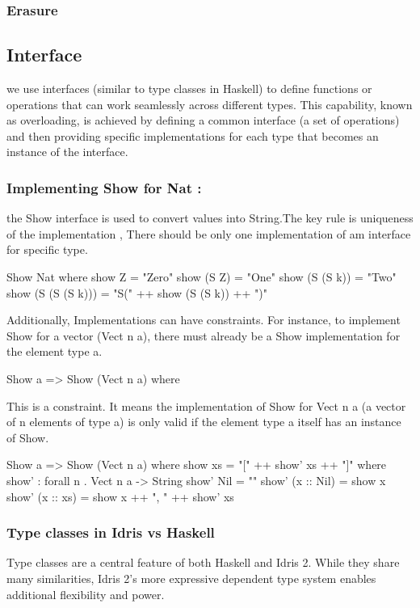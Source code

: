 \documentclass[]{rptuseminar}
\begin{document}
\subsubsection{Erasure}

\subsection{Interface}
we use interfaces (similar to type classes in Haskell) to define functions or operations that can work seamlessly across different types. This capability, known as overloading, is achieved by defining a common interface (a set of operations) and then providing specific implementations for each type that becomes an instance of the interface.

\subsubsection{Implementing Show for Nat :}
the Show interface is used to convert values into String.The key rule is uniqueness of the implementation , There should be only one implementation of am interface for specific type.
\begin{idris}
    Show Nat where
    show Z     = "Zero"
    show (S Z) = "One"
    show (S (S k)) = "Two"
    show (S (S (S k))) = "S(" ++ show (S (S k)) ++ ")"
  
\end{idris}
Additionally, Implementations can have constraints. For instance, to implement Show for a vector (Vect n a), there must already be a Show implementation for the element type a.
\begin{idris}
    Show a => Show (Vect n a) where
\end{idris}
This is a constraint. It means the implementation of Show for Vect n a (a vector of n elements of type a) is only valid if the element type a itself has an instance of Show. 
\begin{idris}
    Show a => Show (Vect n a) where
    show xs = "[" ++ show' xs ++ "]" where
        show' : forall n . Vect n a -> String
        show' Nil        = ""
        show' (x :: Nil) = show x
        show' (x :: xs)  = show x ++ ", " ++ show' xs
\end{idris}
\subsubsection{Type classes in Idris vs Haskell} 
Type classes are a central feature of both Haskell and Idris 2. While they share many similarities, Idris 2's more expressive dependent type system enables additional flexibility and power.
\end{document}
